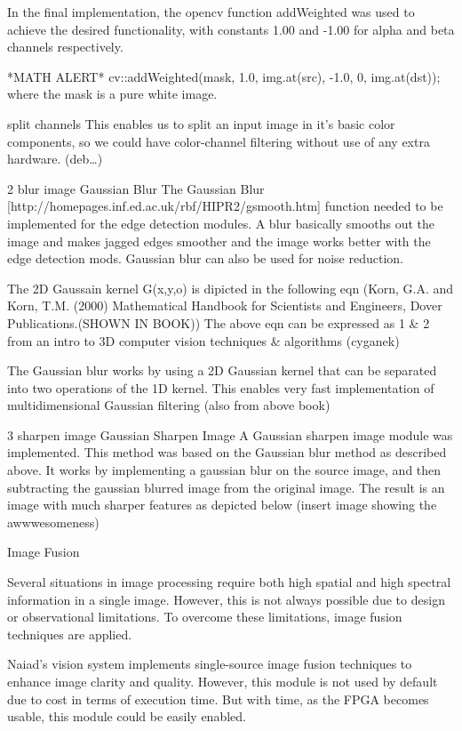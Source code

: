 In the final implementation, the opencv function addWeighted was used to achieve the desired functionality, with constants 1.00 and -1.00 for alpha and beta channels respectively.

*MATH ALERT*
cv::addWeighted(mask, 1.0, img.at(src), -1.0, 0, img.at(dst));
where the mask is a pure white image.


split channels
This enables us to split an input image in it’s basic color components, so we could have color-channel filtering without use of any extra hardware.
(deb…)


2 blur image
Gaussian Blur
The Gaussian Blur [http://homepages.inf.ed.ac.uk/rbf/HIPR2/gsmooth.htm] function needed to be implemented for the edge detection modules. A blur basically smooths out the image and makes jagged edges smoother and the image works better with the edge detection mods. Gaussian blur can also be used for noise reduction.

The 2D Gaussain kernel G(x,y,o) is dipicted in the following eqn
(Korn, G.A. and Korn, T.M. (2000) Mathematical Handbook for Scientists and Engineers, Dover
Publications.(SHOWN IN BOOK))
The above eqn can be expressed as 
1 \& 2 from an intro to 3D computer vision techniques \& algorithms (cyganek)

The Gaussian blur works by using a 2D Gaussian kernel that can be separated into two operations of the 1D kernel. This enables very fast implementation of multidimensional Gaussian filtering (also from above book) 


3 sharpen image
Gaussian Sharpen Image
A Gaussian sharpen image module was implemented. This method was based on the Gaussian blur method as described above. It works by implementing a gaussian blur on the source image, and then subtracting the gaussian blurred image from the original image. The result is an image with much sharper features as depicted below
(insert image showing the awwwesomeness)

Image Fusion

Several situations in image processing require both high spatial and high spectral information in a single image. However, this is not always possible due to design or observational limitations.
To overcome these limitations, image fusion techniques are applied.

Naiad’s vision system implements single-source image fusion techniques to enhance image clarity and quality. However, this module is not used by default due to cost in terms of execution time. But with time, as the FPGA becomes usable, this module could be easily enabled.

